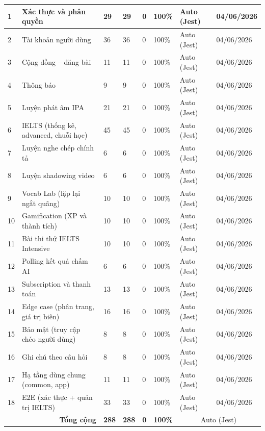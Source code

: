{\begin{longtable}{|p{4\tbu}|p{28\tbu}|p{8\tbu}|p{8\tbu}|p{8\tbu}|p{10\tbu}|p{16\tbu}|p{18\tbu}|}
    1 & Xác thực và phân quyền & 29 & 29 & 0 & 100\% & Auto (Jest) & 04/06/2026 \\ \hline
    2 & Tài khoản người dùng & 36 & 36 & 0 & 100\% & Auto (Jest) & 04/06/2026 \\ \hline
    3 & Cộng đồng -- đăng bài & 11 & 11 & 0 & 100\% & Auto (Jest) & 04/06/2026 \\ \hline
    4 & Thông báo & 9 & 9 & 0 & 100\% & Auto (Jest) & 04/06/2026 \\ \hline
    5 & Luyện phát âm IPA & 21 & 21 & 0 & 100\% & Auto (Jest) & 04/06/2026 \\ \hline
    6 & IELTS (thống kê, advanced, chuỗi học) & 45 & 45 & 0 & 100\% & Auto (Jest) & 04/06/2026 \\ \hline
    7 & Luyện nghe chép chính tả & 6 & 6 & 0 & 100\% & Auto (Jest) & 04/06/2026 \\ \hline
    8 & Luyện shadowing video & 6 & 6 & 0 & 100\% & Auto (Jest) & 04/06/2026 \\ \hline
    9 & Vocab Lab (lặp lại ngắt quãng) & 10 & 10 & 0 & 100\% & Auto (Jest) & 04/06/2026 \\ \hline
    10 & Gamification (XP và thành tích) & 10 & 10 & 0 & 100\% & Auto (Jest) & 04/06/2026 \\ \hline
    11 & Bài thi thử IELTS Intensive & 10 & 10 & 0 & 100\% & Auto (Jest) & 04/06/2026 \\ \hline
    12 & Polling kết quả chấm AI & 6 & 6 & 0 & 100\% & Auto (Jest) & 04/06/2026 \\ \hline
    13 & Subscription và thanh toán & 13 & 13 & 0 & 100\% & Auto (Jest) & 04/06/2026 \\ \hline
    14 & Edge case (phân trang, giá trị biên) & 16 & 16 & 0 & 100\% & Auto (Jest) & 04/06/2026 \\ \hline
    15 & Bảo mật (truy cập chéo người dùng) & 8 & 8 & 0 & 100\% & Auto (Jest) & 04/06/2026 \\ \hline
    16 & Ghi chú theo câu hỏi & 8 & 8 & 0 & 100\% & Auto (Jest) & 04/06/2026 \\ \hline
    17 & Hạ tầng dùng chung (common, app) & 11 & 11 & 0 & 100\% & Auto (Jest) & 04/06/2026 \\ \hline
    18 & E2E (xác thực + quản trị IELTS) & 33 & 33 & 0 & 100\% & Auto (Jest) & 04/06/2026 \\ \hline
    \multicolumn{2}{|r|}{\textbf{Tổng cộng}} & \textbf{288} & \textbf{288} & \textbf{0} & \textbf{100\%} & \multicolumn{2}{c|}{Auto (Jest)} \\ \hline
\end{longtable}
}

